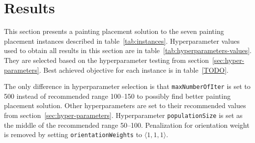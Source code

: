 \clearpage%
\newpage


\section{Results}\label{sec:results}
This section presents a painting placement solution to the seven painting placement instances described in table~\ref{tab:instances}.
Hyperparameter values used to obtain all results in this section are in table~\ref{tab:hyperparameters-values}.
They are selected based on the hyperparameter testing from section~\ref{sec:hyper-parameters}.
Best achieved objective for each instance is in table~\ref{TODO}.

The only difference in hyperparameter selection is that \verb|maxNumberOfIter| is set to 500 instead of recommended range \numrange{100}{150} to possibly find better painting placement solution.
Other hyperparameters are set to their recommended values from section~\ref{sec:hyper-parameters}.
Hyperparameter \verb|populationSize| is set as the middle of the recommended range \numrange{50}{100}.
Penalization for orientation weight is removed by setting \verb|orientationWeights| to $\langle 1,1,1\rangle$.


